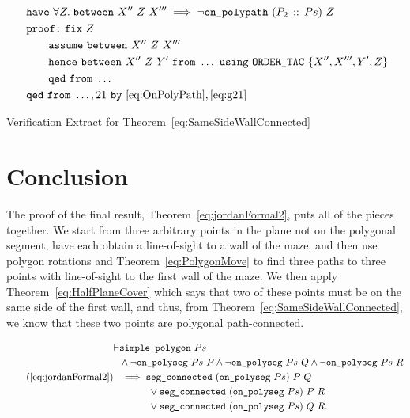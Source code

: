 \begin{boxedfigure}
\begin{align*}
  &\code{have}\ \forall Z.\; \between{X''}{Z}{X'''} \implies \neg\code{on\_polypath}\ (\cons{P_2}{Ps})\ Z\\\
  &\code{proof:}\ \code{fix}\ Z\\
  &\qquad \code{assume}\ \between{X''}{Z}{X'''}\\
  &\qquad \code{hence}\ \between{X''}{Z}{Y'}\ \code{from}\ \ldots\ \code{using}\ \code{ORDER\_TAC}\ \{X'',X''',Y',Z\}\\
  &\qquad \code{qed}\ \code{from}\ \ldots\\
  &\code{qed}\ \code{from}\ \ldots,21\ \code{by}\ \eqref{eq:OnPolyPath},\eqref{eq:g21}
\end{align*}
\caption{Verification Extract for Theorem~\ref{eq:SameSideWallConnected}}
\label{fig:SameSideWallConnectedExtract}
\end{boxedfigure}

\section{Conclusion}
The proof of the final result, Theorem~\ref{eq:jordanFormal2}, puts all of the pieces together. We start from three arbitrary points in the plane not on the polygonal segment, have each obtain a line-of-sight to a wall of the maze, and then use polygon rotations and Theorem~\ref{eq:PolygonMove} to find three paths to three points with line-of-sight to the first wall of the maze. We then apply  Theorem~\ref{eq:HalfPlaneCover} which says that two of these points must be on the same side of the first wall, and thus, from Theorem~\ref{eq:SameSideWallConnected}, we know that these two points are polygonal path-connected.

\begin{equation}\tag{\ref{eq:jordanFormal2}}
\begin{aligned}
\vdash &\code{simple\_polygon}\ Ps\\
       &\wedge \neg\code{on\_polyseg}\ Ps\ P\wedge \neg\code{on\_polyseg}\ Ps\ Q\wedge \neg\code{on\_polyseg}\ Ps\ R\\
       &\implies \code{seg\_connected}\ (\code{on\_polyseg}\ Ps)\ P\ Q\\
       &\qquad\quad\vee \code{seg\_connected}\ (\code{on\_polyseg}\ Ps)\ P\ R\\
       &\qquad\quad\vee \code{seg\_connected}\ (\code{on\_polyseg}\ Ps)\ Q\ R.
\end{aligned}
\end{equation}


